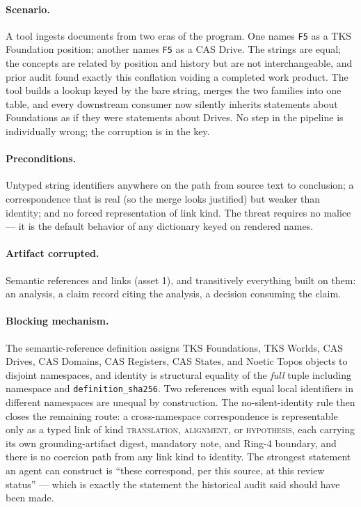 \paragraph{Scenario.} A tool ingests documents from two eras of the program. One names \texttt{F5} as a TKS Foundation position; another names \texttt{F5} as a CAS Drive. The strings are equal; the concepts are related by position and history but are not interchangeable, and prior audit found exactly this conflation voiding a completed work product. The tool builds a lookup keyed by the bare string, merges the two families into one table, and every downstream consumer now silently inherits statements about Foundations as if they were statements about Drives. No step in the pipeline is individually wrong; the corruption is in the key.

\paragraph{Preconditions.} Untyped string identifiers anywhere on the path from source text to conclusion; a correspondence that is real (so the merge looks justified) but weaker than identity; and no forced representation of link kind. The threat requires no malice --- it is the default behavior of any dictionary keyed on rendered names.

\paragraph{Artifact corrupted.} Semantic references and links (asset 1), and transitively everything built on them: an analysis, a claim record citing the analysis, a decision consuming the claim.

\paragraph{Blocking mechanism.} The semantic-reference definition assigns TKS Foundations, TKS Worlds, CAS Drives, CAS Domains, CAS Registers, CAS States, and Noetic Topos objects to disjoint namespaces, and identity is structural equality of the \emph{full} tuple including namespace and \texttt{definition\_sha256}. Two references with equal local identifiers in different namespaces are unequal by construction. The no-silent-identity rule then closes the remaining route: a cross-namespace correspondence is representable only as a typed link of kind \textsc{translation}, \textsc{alignment}, or \textsc{hypothesis}, each carrying its own grounding-artifact digest, mandatory note, and Ring-4 boundary, and there is no coercion path from any link kind to identity. The strongest statement an agent can construct is ``these correspond, per this source, at this review status'' --- which is exactly the statement the historical audit said should have been made.

